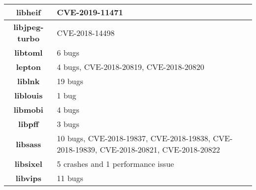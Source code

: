 \begin{table}[h]
\begin{tabular}{|c|l|}
\textbf{libheif}                 & CVE-2019-11471
    \\ \hline
\textbf{libjpeg-turbo}  & CVE-2018-14498                                                                                                                                                                                     \\ \hline
\textbf{libtoml}        & 6 bugs                                                                                                                                                                                             \\ \hline
\textbf{lepton}         & 4 bugs, CVE-2018-20819, CVE-2018-20820                                                                                                                                                                                         \\ \hline
\textbf{liblnk}         & 19 bugs                                                                                                                                                                                            \\ \hline
\textbf{liblouis}       & 1 bug                                                                                                                                                                                              \\ \hline
\textbf{libmobi}        & 4 bugs                                                                                                                                                                                             \\ \hline
\textbf{libpff}         & 3 bugs                                                                                                                                                                                             \\ \hline
\textbf{libsass}        & 10 bugs, CVE-2018-19837, CVE-2018-19838, CVE-2018-19839,  CVE-2018-20821, CVE-2018-20822                                                                                                                \\ \hline
\textbf{libsixel}       & 5 crashes and 1 performance issue                                                                                                                                                                  \\ \hline
\textbf{libvips}        & 11 bugs                                                                                                                                                                                            \\ \hline

\end{tabular}
\end{table}
